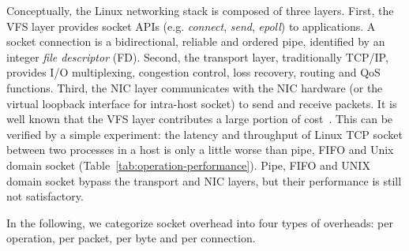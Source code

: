 Conceptually, the Linux networking stack is composed of three layers. First, the VFS layer provides socket APIs (e.g. \emph{connect}, \emph{send}, \emph{epoll}) to applications. A socket connection is a bidirectional, reliable and ordered pipe, identified by an integer \emph{file descriptor} (FD).
Second, the transport layer, traditionally TCP/IP, provides I/O multiplexing, congestion control, loss recovery, routing and QoS functions.
Third, the NIC layer communicates with the NIC hardware (or the virtual loopback interface for intra-host socket) to send and receive packets.
It is well known that the VFS layer contributes a large portion of cost~\cite{clark1989analysis,boyd2010analysis}.
This can be verified by a simple experiment: the latency and throughput of Linux TCP socket between two processes in a host is only a little worse than pipe, FIFO and Unix domain socket (Table~\ref{tab:operation-performance}).
Pipe, FIFO and UNIX domain socket bypass the transport and NIC layers, but their performance is still not satisfactory.

In the following, we categorize socket overhead into four types of overheads: per operation, per packet, per byte and per connection.

